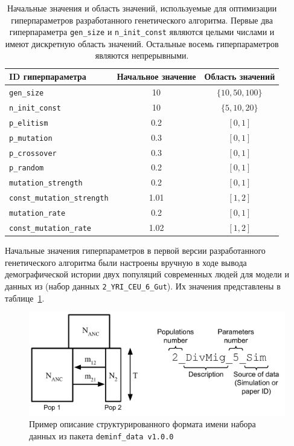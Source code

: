 \begin{table}[ht]
    \caption{Начальные значения и область значений, используемые для оптимизации гиперпараметров разработанного генетического алгоритма. Первые два гиперпараметра \texttt{gen\_size} и \texttt{n\_init\_const} являются целыми числами и имеют дискретную область значений. Остальные восемь гиперпараметров являются непрерывными.}
    \centering
    \begin{tabular}{lcc}
        \toprule
        ID гиперпараметра & Начальное значение & Область значений \\
        \midrule
        \texttt{gen\_size} & 10 & $\{10, 50, 100\}$ \\
        \texttt{n\_init\_const} & 10 & $\{5, 10, 20\}$ \\
        \texttt{p\_elitism} & 0.2 & $[0, 1]$ \\
        \texttt{p\_mutation} & 0.3 & $[0, 1]$ \\
        \texttt{p\_crossover} & 0.3 & $[0, 1]$ \\
        \texttt{p\_random} & 0.2 & $[0, 1]$ \\
        \texttt{mutation\_strength} & 0.2 & $[0, 1]$ \\
        \texttt{const\_mutation\_strength} & 1.01 & $[1, 2]$ \\
        \texttt{mutation\_rate} & 0.2 & $[0, 1]$ \\
        \texttt{const\_mutation\_rate} & 1.02 & $[1, 2]$ \\
        \bottomrule
    \end{tabular}
    \label{tab:hyper_domain}
\end{table}

Начальные значения гиперпараметров в первой версии разработанного генетического алгоритма были настроены вручную в ходе вывода демографической истории двух популяций современных людей для модели и данных из \cite{gutenkunst2009inferring} (набор данных \texttt{2\_YRI\_CEU\_6\_Gut}).
Их значения представлены в таблице~\ref{tab:hyper_domain}.

\begin{figure}[ht]
    \centering
    \includegraphics[width=0.6\linewidth]{images/part2/genetics_algorithm/deminf_data_example.pdf}
    \caption{Пример описание структурированного формата имени набора данных из пакета \texttt{deminf\_data v1.0.0}}
    \label{fig:part2:genetic_algorithm:HPO:datasets}
\end{figure}

